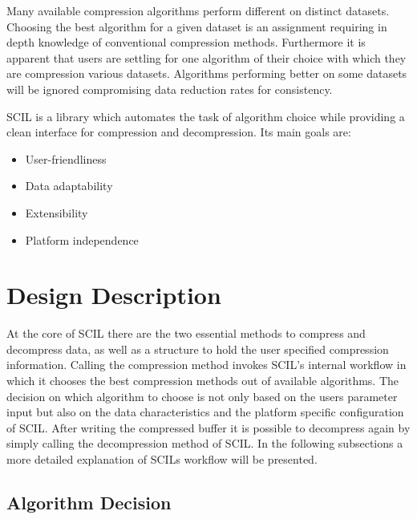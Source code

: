 \documentclass[
	12pt,
	a4paper,
	BCOR10mm,
	DIV14,
	headsepline,
]{scrreprt}
\begin{document}
Many available compression algorithms perform different on distinct datasets.
Choosing the best algorithm for a given dataset is an assignment requiring
in depth knowledge of conventional compression methods. Furthermore it is
apparent that users are settling for one algorithm of their choice with which
they are compression various datasets. Algorithms performing better on some
datasets will be ignored compromising data reduction rates for consistency.\par
SCIL is a library which automates the task of algorithm choice while providing
a clean interface for compression and decompression. Its main goals are:

\bigskip

\begin{itemize}
	\item User-friendliness
	\item Data adaptability
	\item Extensibility
	\item Platform independence
\end{itemize}

\bigskip

\clearpage

\section{Design Description}

\bigskip

At the core of SCIL there are the two essential methods to compress and
decompress data, as well as a structure to hold the user specified compression
information. Calling the compression method invokes SCIL's internal workflow in
which it chooses the best compression methods out of available algorithms.
The decision on which algorithm to choose is not only based on the users
parameter input but also on the data characteristics and the platform specific
configuration of SCIL. After writing the compressed buffer it is possible to
decompress again by simply calling the decompression method of SCIL.
In the following subsections a more detailed explanation of SCILs workflow
will be presented.

\bigskip

\subsection{Algorithm Decision}

\bigskip
\end{document}

